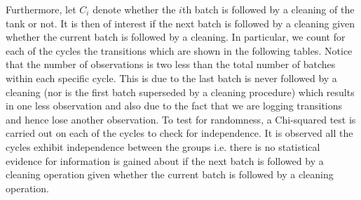 \documentclass[../Thesis.tex]{subfiles}
\begin{document}
Furthermore, let $C_i$ denote whether the $i$th batch is followed by a cleaning of the tank or not. It is then of interest if the next batch is followed by a cleaning given whether the current batch is followed by a cleaning. In particular, we count for each of the cycles the transitions which are shown in the following tables. Notice that the number of observations is two less than the total number of batches within each specific cycle. This is due to the last batch is never followed by a cleaning (nor is the first batch superseded by a cleaning procedure) which results in one less observation and also due to the fact that we are logging transitions and hence lose another observation. To test for randomness, a Chi-squared test is carried out on each of the cycles to check for independence. It is observed all the cycles exhibit independence between the groups i.e. there is no statistical evidence for information is gained about if the next batch is followed by a cleaning operation given whether the current batch is followed by a cleaning operation.
\end{document}
